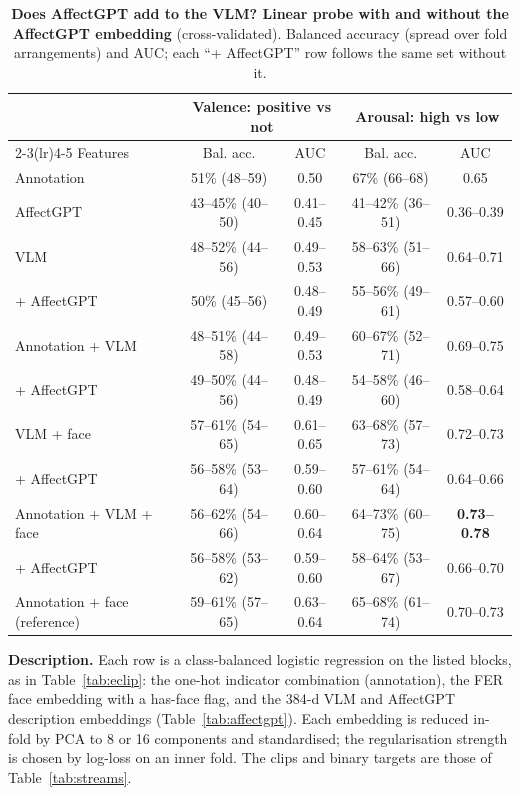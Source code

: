 \documentclass[11pt]{article}
\newcommand{\best}[1]{\textbf{#1}}
\newcommand{\tabledesc}[1]{\par\medskip\begin{minipage}{\linewidth}\footnotesize\textbf{Description.} #1\end{minipage}}
\begin{document}
\begin{table}[!htbp]
\centering
\caption{\textbf{Does AffectGPT add to the VLM? Linear probe with and without the AffectGPT embedding} (cross-validated). Balanced accuracy (spread over fold arrangements) and AUC; each ``+ AffectGPT'' row follows the same set without it.}
\label{tab:affectgpt_linear}
\small
\begin{tabular}{lcccc}
\toprule
 & \multicolumn{2}{c}{Valence: positive vs not} & \multicolumn{2}{c}{Arousal: high vs low} \\
\cmidrule(lr){2-3}\cmidrule(lr){4-5}
Features & Bal. acc. & AUC & Bal. acc. & AUC \\
\midrule
Annotation & 51\% (48--59) & 0.50 & 67\% (66--68) & 0.65 \\
AffectGPT & 43--45\% (40--50) & 0.41--0.45 & 41--42\% (36--51) & 0.36--0.39 \\
\midrule
VLM & 48--52\% (44--56) & 0.49--0.53 & 58--63\% (51--66) & 0.64--0.71 \\
\quad + AffectGPT & 50\% (45--56) & 0.48--0.49 & 55--56\% (49--61) & 0.57--0.60 \\
Annotation + VLM & 48--51\% (44--58) & 0.49--0.53 & 60--67\% (52--71) & 0.69--0.75 \\
\quad + AffectGPT & 49--50\% (44--56) & 0.48--0.49 & 54--58\% (46--60) & 0.58--0.64 \\
VLM + face & 57--61\% (54--65) & 0.61--0.65 & 63--68\% (57--73) & 0.72--0.73 \\
\quad + AffectGPT & 56--58\% (53--64) & 0.59--0.60 & 57--61\% (54--64) & 0.64--0.66 \\
Annotation + VLM + face & 56--62\% (54--66) & 0.60--0.64 & 64--73\% (60--75) & \best{0.73--0.78} \\
\quad + AffectGPT & 56--58\% (53--62) & 0.59--0.60 & 58--64\% (53--67) & 0.66--0.70 \\
\midrule
Annotation + face (reference) & 59--61\% (57--65) & 0.63--0.64 & 65--68\% (61--74) & 0.70--0.73 \\
\bottomrule
\end{tabular}
\tabledesc{Each row is a class-balanced logistic regression on the listed blocks, as in Table~\ref{tab:eclip}: the one-hot indicator combination (annotation), the FER face embedding with a has-face flag, and the 384-d VLM and AffectGPT description embeddings (Table~\ref{tab:affectgpt}). Each embedding is reduced in-fold by PCA to 8 or 16 components and standardised; the regularisation strength is chosen by log-loss on an inner fold. The clips and binary targets are those of Table~\ref{tab:streams}.
}
\end{table}
\end{document}
